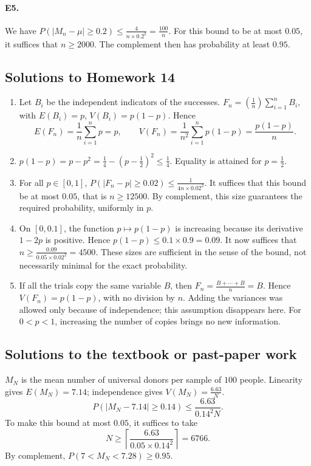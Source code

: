 \paragraph{E5.}We have $P(|M_n-\mu|\ge\num{0,2})\le\frac{4}{n\times\num{0,2}^2}=\frac{100}{n}$. For this bound to be at most $\num{0,05}$, it suffices that $n\ge2000$. The complement then has probability at least $\num{0,95}$.

\subsection{Solutions to Homework 14}\begin{enumerate}
\item Let $B_i$ be the independent indicators of the successes. $F_n=(\frac{1}{n})\sum_{i=1}^nB_i$, with $E(B_i)=p$, $V(B_i)=p(1-p)$. Hence
\[E(F_n)=\frac1n\sum_{i=1}^n p=p,\qquad V(F_n)=\frac1{n^2}\sum_{i=1}^np(1-p)=\frac{p(1-p)}n.\]
\item $p(1-p)=p-p^2=\frac{1}{4}-(p-\frac{1}{2})^2\le\frac{1}{4}$. Equality is attained for $p=\frac{1}{2}$.
\item For all $p\in[0,1]$, $P(|F_n-p|\ge\num{0,02})\le\frac{1}{4n\times\num{0,02}^2}$. It suffices that this bound be at most $\num{0,05}$, that is $n\ge12500$. By complement, this size guarantees the required probability, uniformly in $p$.
\item On $[0,\num{0,1}]$, the function $p\mapsto p(1-p)$ is increasing because its derivative $1-2p$ is positive. Hence $p(1-p)\le\num{0,1}\times\num{0,9}=\num{0,09}$. It now suffices that $n\ge\frac{\num{0,09}}{\num{0,05}\times\num{0,02}^2}=4500$. These sizes are sufficient in the sense of the bound, not necessarily minimal for the exact probability.
\item If all the trials copy the same variable $B$, then $F_n=\frac{B+\cdots+B}{n}=B$. Hence $V(F_n)=p(1-p)$, with no division by $n$. Adding the variances was allowed only because of independence; this assumption disappears here. For $0<p<1$, increasing the number of copies brings no new information.
\end{enumerate}

\subsection{Solutions to the textbook or past-paper work}$M_N$ is the mean number of universal donors per sample of $100$ people. Linearity gives $E(M_N)=\num{7,14}$; independence gives $V(M_N)=\frac{\num{6,63}}N$.
\[P(|M_N-\num{7,14}|\ge\num{0,14})\le\frac{\num{6,63}}{\num{0,14}^2N}.\]
To make this bound at most $\num{0,05}$, it suffices to take
\[N\ge\left\lceil\frac{\num{6,63}}{\num{0,05}\times\num{0,14}^2}\right\rceil=6766.\]
By complement, $P(7<M_N<\num{7,28})\ge\num{0,95}$.

\fi

